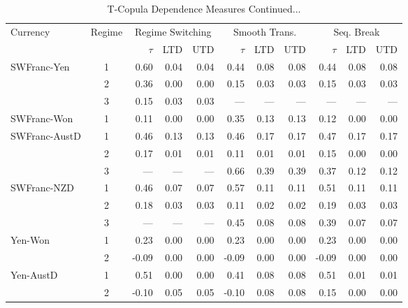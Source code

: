 \documentclass[12pt]{article}
\begin{document}
\begin{table}
\caption{T-Copula Dependence Measures Continued...}
\begin{threeparttable}
	\begin{tabular}[c]{l c r r r | r r r | r r r}
\hline \hline
\noalign{\smallskip}
Currency & Regime & \multicolumn{3}{c}{Regime Switching} & \multicolumn{3}{c}{Smooth Trans.} & \multicolumn{3}{c}{Seq. Break} \\
\noalign{\smallskip}
\hline
\noalign{\smallskip}
 & & $\tau$ & LTD & UTD & $\tau$ & LTD & UTD & $\tau$ & LTD & UTD \\
 \hline
\noalign{\smallskip}
SWFranc-Yen & 1 & 0.60 & 0.04 & 0.04 & 0.44  & 0.08  & 0.08  & 0.44  & 0.08  & 0.08  \\
		    & 2 & 0.36 & 0.00 & 0.00 & 0.15  & 0.03  & 0.03  & 0.15  & 0.03  & 0.03  \\
		    & 3 & 0.15 & 0.03 & 0.03 & ---  & ---  & ---  & ---  & ---  & ---  \\
\noalign{\smallskip} \noalign{\smallskip}
SWFranc-Won & 1 & 0.11 & 0.00 & 0.00 & 0.35  & 0.13  & 0.13  & 0.12  & 0.00  & 0.00  \\
\noalign{\smallskip} \noalign{\smallskip}
SWFranc-AustD & 1 & 0.46 & 0.13 & 0.13 & 0.46  & 0.17  & 0.17  & 0.47  & 0.17  & 0.17  \\
			  & 2 & 0.17 & 0.01 & 0.01 & 0.11  & 0.01  & 0.01  & 0.15  & 0.00  & 0.00  \\
			  & 3 & --- & --- & --- & 0.66  & 0.39  & 0.39  & 0.37  & 0.12  & 0.12  \\
\noalign{\smallskip} \noalign{\smallskip}
SWFranc-NZD & 1 & 0.46 & 0.07 & 0.07 & 0.57  & 0.11  & 0.11  & 0.51  & 0.11  & 0.11  \\
		    & 2 & 0.18 & 0.03 & 0.03 & 0.11  & 0.02  & 0.02  & 0.19  & 0.03  & 0.03  \\
		    & 3 & --- & --- & --- & 0.45  & 0.08  & 0.08  & 0.39  & 0.07  & 0.07  \\
\noalign{\smallskip}
\hline
\noalign{\smallskip} \noalign{\smallskip}
Yen-Won & 1 & 0.23 & 0.00 & 0.00 & 0.23  & 0.00  & 0.00  & 0.23  & 0.00  & 0.00  \\
		& 2 & -0.09 & 0.00 & 0.00 & -0.09  & 0.00  & 0.00  & -0.09  & 0.00  & 0.00  \\
\noalign{\smallskip} \noalign{\smallskip}
Yen-AustD & 1 & 0.51 & 0.00 & 0.00 & 0.41  & 0.08  & 0.08  & 0.51  & 0.01  & 0.01  \\
		  & 2 & -0.10 & 0.05 & 0.05 & -0.10  & 0.08  & 0.08  & 0.15  & 0.00  & 0.00  \\

\end{tabular}
\end{threeparttable}
\end{table}
\end{document}
